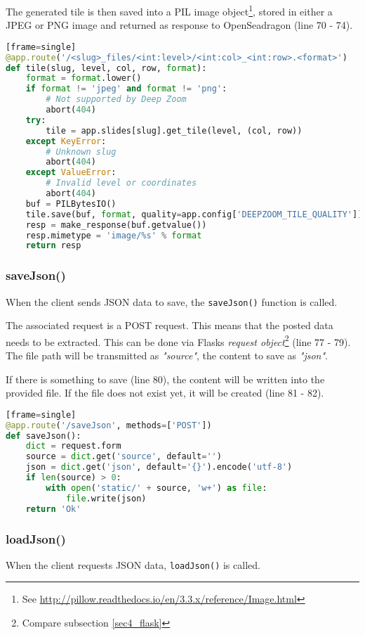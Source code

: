 The generated tile is then saved into a PIL image object\footnote{See \url{http://pillow.readthedocs.io/en/3.3.x/reference/Image.html}}, stored in either a JPEG or PNG image and returned as response to OpenSeadragon (line 70 - 74).

\begin{lstlisting}[language=Python][frame=single]
@app.route('/<slug>_files/<int:level>/<int:col>_<int:row>.<format>')
def tile(slug, level, col, row, format):
	format = format.lower()
	if format != 'jpeg' and format != 'png':
		# Not supported by Deep Zoom
		abort(404)
	try:
		tile = app.slides[slug].get_tile(level, (col, row))
	except KeyError:
		# Unknown slug
		abort(404)
	except ValueError:
		# Invalid level or coordinates
		abort(404)
	buf = PILBytesIO()
	tile.save(buf, format, quality=app.config['DEEPZOOM_TILE_QUALITY'])
	resp = make_response(buf.getvalue())
	resp.mimetype = 'image/%s' % format
	return resp
\end{lstlisting}


\subsubsection{saveJson()}
When the client sends JSON data to save, the \texttt{saveJson()} function is called.

The associated request is a POST request. This means that the posted data needs to be extracted. This can be done via Flasks \emph{request object}\footnote{Compare subsection \ref{sec4_flask}} (line 77 - 79). The file path will be transmitted as \emph{"source"}, the content to save as \emph{"json"}.

If there is something to save (line 80), the content will be written into the provided file. If the file does not exist yet, it will be created (line 81 - 82).

\begin{lstlisting}[language=Python][frame=single]
@app.route('/saveJson', methods=['POST'])
def saveJson():
	dict = request.form
	source = dict.get('source', default='')
	json = dict.get('json', default='{}').encode('utf-8')
	if len(source) > 0:
		with open('static/' + source, 'w+') as file:
			file.write(json)
	return 'Ok'
\end{lstlisting}


\subsubsection{loadJson()}
When the client requests JSON data, \texttt{loadJson()} is called.

